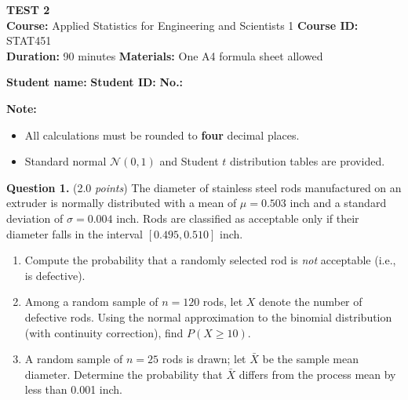 \documentclass[12pt]{article}
\begin{document}
\begin{center}
\textbf{\large TEST 2}\\[2pt]
\textbf{Course:} Applied Statistics for Engineering and Scientists 1 \quad
\textbf{Course ID:} STAT451\\[2pt]
\textbf{Duration:} 90 minutes \hspace{1.5cm} \textbf{Materials:} One A4 formula sheet allowed
\end{center}

\vspace{-6pt}
\noindent\textbf{Student name:} \dotfill \quad \textbf{Student ID:} \dotfill \quad \textbf{No.:} \dotfill

\vspace{4pt}
\noindent\textbf{Note:}
\begin{itemize}[leftmargin=*,topsep=2pt,itemsep=0pt]
  \item All calculations must be rounded to \textbf{four} decimal places.
  \item Standard normal $\mathcal{N}(0,1)$ and Student $t$ distribution tables are provided.
\end{itemize}

\textbf{Question 1.} (2.0 \emph{points})
The diameter of stainless steel rods manufactured on an extruder is
normally distributed with a mean of $\mu = 0.503$ inch and a standard
deviation of $\sigma = 0.004$ inch. Rods are classified as acceptable
only if their diameter falls in the interval $[0.495, 0.510]$ inch.
\begin{enumerate}[label=(\alph*),leftmargin=*]
  \item Compute the probability that a randomly selected rod is
        \emph{not} acceptable (i.e., is defective).
  \item Among a random sample of $n = 120$ rods, let $X$ denote the
        number of defective rods. Using the normal approximation to
        the binomial distribution (with continuity correction), find
        $P(X \geq 10)$.
  \item A random sample of $n = 25$ rods is drawn; let $\bar{X}$ be
        the sample mean diameter. Determine the probability that
        $\bar{X}$ differs from the process mean by less than
        0.001 inch.
\end{enumerate}
\end{document}
